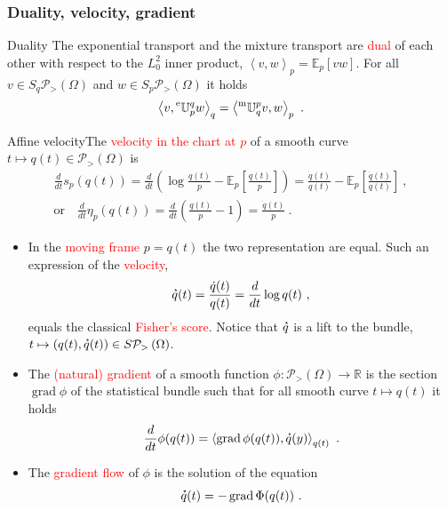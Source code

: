 \documentclass[xcolor=svgnames]{beamer}
\DeclareMathOperator{\Grad}{grad}
\newcommand{\derivby}[1]{\frac{d}{d#1}}
\newcommand{\etransport}[2]{\prescript{\text{e}}{} {\mathbb U} _ {#1} ^ {#2}}
\newcommand{\expbundleat}[1]{S#1}
\newcommand{\expectat}[2]{\mathbb E_{#1}\left[#2\right]}
\newcommand{\expfibreat}[2]{S_{#1}#2}
\newcommand{\mtransport}[2]{\prescript{\text{m}}{} {\mathbb U} _ {#1} ^ {#2}}
\newcommand{\opensimplexon}[1]{\mathcal P_>\left(#1\right)}
\newcommand{\reals}{\mathbb{R}}
\newcommand{\rosso}[1]{\textcolor{red}{#1}}
\newcommand{\scalarat}[3]{\left\langle#2,#3\right\rangle_{#1}}
\newcommand{\velocity}[1]{\accentset{\star}{#1}}
\renewcommand{\emph}{\rosso}
\begin{document}
\begin{frame}\small
  \frametitle{Duality, velocity, gradient}
  \begin{block}{Duality}
    The exponential transport and the mixture transport are \emph{dual} of each other with respect to the $L^2_0$ inner product, $\scalarat p v w = \expectat p {v w}$. For all $v \in \expfibreat q {\opensimplexon \Omega}$ and $w \in \expfibreat p {\opensimplexon \Omega}$ it holds
  \begin{equation*}
    \scalarat q v {\etransport p q w} = \scalarat p {\mtransport q p v} w \ . 
  \end{equation*}
\end{block}
\begin{block}{Affine velocity}The \emph{velocity  in the chart at $p$} of a smooth curve $t \mapsto q(t) \in \opensimplexon \Omega$ is
  \begin{gather*}
    \derivby t s_p(q(t)) = \derivby t \left(\log \frac  {q(t)} p  - \expectat p {\frac  {q(t)} p }\right) = \frac{\dot q(t)} {q(t)} - \expectat p {\frac{\dot q(t)} {q(t)}} \ ,\\ \text{or} \quad
    \derivby t \eta_p(q(t)) = \derivby t \left(\frac {q(t)} p -1\right) = \frac {\dot q(t)} p \ .
  \end{gather*}
\end{block}
\begin{itemize}
\item In the \emph{moving frame} $p = q(t)$ the two representation are equal. Such an expression of the \emph{velocity},
    \begin{equation*}
      \velocity q(t) = \frac {\dot q(t)}{q(t)} = \derivby t \log q(t) \ ,  
    \end{equation*}
    equals the classical \emph{Fisher's score}. Notice that $\velocity q$ is a lift to the bundle, $t \mapsto (q(t), \velocity q(t)) \in \expbundleat {\opensimplexon \Omega}$.
  \item The \emph{(natural) gradient} of a smooth function $\phi \colon \opensimplexon \Omega \to \reals$ is the section $\Grad \phi$ of the statistical bundle such that for all smooth curve $t \mapsto q(t)$ it holds
    \begin{equation*}
      \derivby t \phi(q(t)) = \scalarat {q(t)} {\Grad \phi(q(t))} {\velocity q(y)} \ .
    \end{equation*}
    \item The \emph{gradient flow} of $\phi$ is the solution of the equation
      \begin{equation*}
        \velocity q(t) = - \Grad \Phi(q(t)) \ .
      \end{equation*}
  \end{itemize}
\end{frame}
\end{document}
